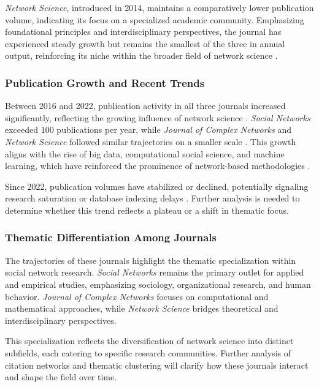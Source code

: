 \documentclass[twocolumn]{article}
\begin{document}
	\textit{Network Science}, introduced in 2014, maintains a comparatively lower publication volume, indicating its focus on a specialized academic community. Emphasizing foundational principles and interdisciplinary perspectives, the journal has experienced steady growth but remains the smallest of the three in annual output, reinforcing its niche within the broader field of network science \cite{Barabasi2016}.
	
	
	\subsubsection*{Publication Growth and Recent Trends}
	
	Between 2016 and 2022, publication activity in all three journals increased significantly, reflecting the growing influence of network science \cite{Newman2018, Barabasi2016}. \textit{Social Networks} exceeded 100 publications per year, while \textit{Journal of Complex Networks} and \textit{Network Science} followed similar trajectories on a smaller scale \cite{Borgatti2013}. This growth aligns with the rise of big data, computational social science, and machine learning, which have reinforced the prominence of network-based methodologies \cite{Lazer2009, Watts2011}.
	
	Since 2022, publication volumes have stabilized or declined, potentially signaling research saturation or database indexing delays \cite{Fortunato2018}. Further analysis is needed to determine whether this trend reflects a plateau or a shift in thematic focus.
	
	
	\subsubsection*{Thematic Differentiation Among Journals}
	
	The trajectories of these journals highlight the thematic specialization within social network research. \textit{Social Networks} remains the primary outlet for applied and empirical studies, emphasizing sociology, organizational research, and human behavior. \textit{Journal of Complex Networks} focuses on computational and mathematical approaches, while \textit{Network Science} bridges theoretical and interdisciplinary perspectives.
	
	This specialization reflects the diversification of network science into distinct subfields, each catering to specific research communities. Further analysis of citation networks and thematic clustering will clarify how these journals interact and shape the field over time.
	
\end{document}
